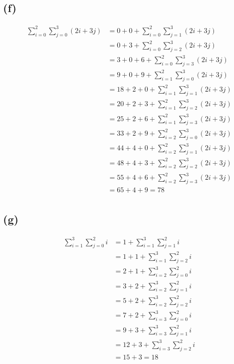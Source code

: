\documentclass{article}
\begin{document}
\subsection*{(f)}
\begin{equation} \label{eq6}
\begin{split}
\sum\limits_{i=0}^{2}\sum\limits_{j=0}^{3}(2i + 3j) & =  0 + 0 + \sum\limits_{i=0}^{2}\sum\limits_{j=1}^{3}(2i + 3j) \\
& =  0 + 3 + \sum\limits_{i=0}^{2}\sum\limits_{j=2}^{3}(2i + 3j) \\
& =  3 + 0 + 6 + \sum\limits_{i=0}^{2}\sum\limits_{j=3}^{3}(2i + 3j) \\
& =  9 + 0 + 9 + \sum\limits_{i=1}^{2}\sum\limits_{j=0}^{3}(2i + 3j) \\
& =  18 + 2 + 0 + \sum\limits_{i=1}^{2}\sum\limits_{j=1}^{3}(2i + 3j) \\
& =  20 + 2 + 3 + \sum\limits_{i=1}^{2}\sum\limits_{j=2}^{3}(2i + 3j) \\
& =  25 + 2 + 6 + \sum\limits_{i=1}^{2}\sum\limits_{j=3}^{3}(2i + 3j) \\
& =  33 + 2 + 9 + \sum\limits_{i=2}^{2}\sum\limits_{j=0}^{3}(2i + 3j) \\
& =  44 + 4 + 0 + \sum\limits_{i=2}^{2}\sum\limits_{j=1}^{3}(2i + 3j) \\
& =  48 + 4 + 3 + \sum\limits_{i=2}^{2}\sum\limits_{j=2}^{3}(2i + 3j) \\
& =  55 + 4 + 6 + \sum\limits_{i=2}^{2}\sum\limits_{j=3}^{3}(2i + 3j) \\
& =  65 + 4 + 9 = 78 \\
\end{split}
\end{equation}


\subsection*{(g)}
\begin{equation} \label{eq7}
\begin{split}
\sum\limits_{i=1}^{3}\sum\limits_{j=0}^{2}i & =  1 + \sum\limits_{i=1}^{3}\sum\limits_{j=1}^{2}i \\
& =  1 + 1 + \sum\limits_{i=1}^{3}\sum\limits_{j=2}^{2}i \\
& =  2 + 1 + \sum\limits_{i=2}^{3}\sum\limits_{j=0}^{2}i \\ 
& =  3 + 2 + \sum\limits_{i=2}^{3}\sum\limits_{j=1}^{2}i \\ 
& =  5 + 2 + \sum\limits_{i=2}^{3}\sum\limits_{j=2}^{2}i \\ 
& =  7 + 2 + \sum\limits_{i=3}^{3}\sum\limits_{j=0}^{2}i \\ 
& =  9 + 3 + \sum\limits_{i=3}^{3}\sum\limits_{j=1}^{2}i \\ 
& =  12 + 3 + \sum\limits_{i=3}^{3}\sum\limits_{j=2}^{2}i \\ 
& =  15 + 3 = 18\\ 
\end{split}
\end{equation}
\end{document}
